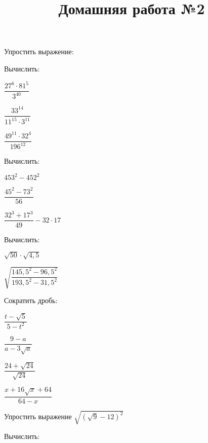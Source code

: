 \newpage
\title{Домашняя работа №2}
\begin{listofex}
	\item Упростить выражение:
	\begin{enumcols}[itemcolumns=2]
		\item {}
		\item {}
		\item {}
		\item {}
	\end{enumcols}
	\item Вычислить:
	\begin{enumcols}[itemcolumns=3]
		\item \( \dfrac{27^6\cdot81^5}{3^{40}} \)
		\item \( \dfrac{33^{14}}{11^{15}\cdot3^{11}} \)
		\item \( \dfrac{49^{11}\cdot32^{4}}{196^{12}} \)
	\end{enumcols}
	\item Вычислить:
	\begin{enumcols}[itemcolumns=3]
		\item \( 453^2-452^2 \)
		\item \( \dfrac{45^2-73^2}{56} \)
		\item \( \dfrac{32^3+17^3}{49}-32\cdot17 \)
	\end{enumcols}
	\item Вычислить:
	\begin{enumcols}[itemcolumns=3]
		\item \( \sqrt{50}\cdot\sqrt{4,5} \)
		\item \( \sqrt{\dfrac{145,5^2-96,5^2}{193,5^2-31,5^2}} \)
		\item {}
	\end{enumcols}
	\item Сократить дробь:
	\begin{enumcols}[itemcolumns=4]
		\item \( \dfrac{t-\sqrt{5}}{5-t^2} \)
		\item \( \dfrac{9-a}{a-3\sqrt{a}} \)
		\item \( \dfrac{24+\sqrt{24}}{\sqrt{24}} \)
		\item \( \dfrac{x+16\sqrt{x}+64}{64-x} \)
	\end{enumcols}
	\item Упростить выражение \( \sqrt{(\sqrt{9}-12)^2} \)
	\item Вычислить:
	\begin{enumcols}[itemcolumns=2]
		\item {}
		\item {}
	\end{enumcols}
\end{listofex}
